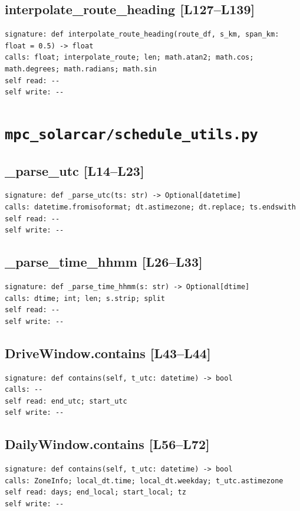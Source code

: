 \documentclass[a4paper,10pt,oneside]{book}
\begin{document}
\subsection*{interpolate\_route\_heading [L127--L139]}
\begin{lstlisting}[numbers=none]
signature: def interpolate_route_heading(route_df, s_km, span_km: float = 0.5) -> float
calls: float; interpolate_route; len; math.atan2; math.cos; math.degrees; math.radians; math.sin
self read: --
self write: --
\end{lstlisting}
\section{\texttt{mpc\_solarcar/schedule\_utils.py}}
\subsection*{\_parse\_utc [L14--L23]}
\begin{lstlisting}[numbers=none]
signature: def _parse_utc(ts: str) -> Optional[datetime]
calls: datetime.fromisoformat; dt.astimezone; dt.replace; ts.endswith
self read: --
self write: --
\end{lstlisting}
\subsection*{\_parse\_time\_hhmm [L26--L33]}
\begin{lstlisting}[numbers=none]
signature: def _parse_time_hhmm(s: str) -> Optional[dtime]
calls: dtime; int; len; s.strip; split
self read: --
self write: --
\end{lstlisting}
\subsection*{DriveWindow.contains [L43--L44]}
\begin{lstlisting}[numbers=none]
signature: def contains(self, t_utc: datetime) -> bool
calls: --
self read: end_utc; start_utc
self write: --
\end{lstlisting}
\subsection*{DailyWindow.contains [L56--L72]}
\begin{lstlisting}[numbers=none]
signature: def contains(self, t_utc: datetime) -> bool
calls: ZoneInfo; local_dt.time; local_dt.weekday; t_utc.astimezone
self read: days; end_local; start_local; tz
self write: --
\end{lstlisting}
\end{document}
